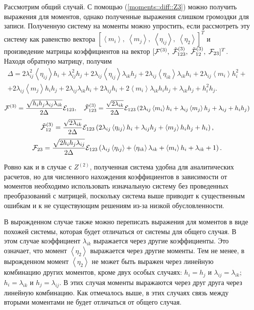 \documentclass[12pt]{article}
\def\sr#1{\left<#1\right>}
\def\ZV{Z^{(2)}}
\begin{document}
Рассмотрим общий случай. С помощью (\ref{moments::diff::Z3}) можно получить выражения для моментов, однако полученные выражения слишком громоздки для записи. Полученную систему на моменты можно упростить, если рассмотреть эту систему как равенство вектора $[\sr{m_i},\; \sr{m_j},\;\sr{\eta_{ij}},\; \sr{\eta_2}]^T$ и произведение матрицы коэффициентов на вектор $[{\cal F}^{(3)},\; \tilde{\cal F}_{123}^{(3)},\; \tilde{\cal F}_{12}^{(3)},\; {\cal F}_{23}]^T$. Находя обратную матрицу, получим
\begin{multline*}
    \Delta = 2 \lambda_{ij}^{2} \left<\eta_{ij}\right> h_i + \lambda_{ij}^{2} h_j + 2 \lambda_{ij} \left<\eta_{ij}\right> \lambda_{ik} h_j + 2 \lambda_{ij} \left<\eta_{ik}\right> \lambda_{ik} h_i + 2 \lambda_{ij} \left<{m_i}\right> h_i^{2} +
    \\
    + 2 \lambda_{ij} \left<{m_j}\right> h_i h_j + 2 \lambda_{ij} \lambda_{ik} h_i + 2 \lambda_{ij} h_i + 2 \left<{m_i}\right> \lambda_{ik} h_i h_j + \lambda_{ik} h_j + h_i^{2} h_j.
\end{multline*}
\begin{equation}
    {\cal F}^{(3)} = \frac{\sqrt{h_ih_j\lambda_{ij}\lambda_{ik}}}{2 \Delta}{\cal E}_{123}, \quad
    \tilde{\cal F}_{123}^{(3)} = \frac{\sqrt{2\lambda_{ik}}}{2 \Delta}{\cal E}_{123} \left(2 \lambda_{ij} \left<{m_i}\right> h_i + \lambda_{ij} \left<{m_j}\right> h_j + \lambda_{ij} + h_i h_j\right)
\end{equation}
\begin{equation}
    \tilde{\cal F}_{12}^{(3)} = \frac{\sqrt{2\lambda_{ik}}}{2 \Delta}{\cal E}_{123} \left(2 \lambda_{ij} \left<\eta_{ij}\right> h_i + \lambda_{ij} h_j + \left<{m_j}\right> h_i h_j + h_i\right),
\end{equation}
\begin{equation}
    {\cal F}_{23} = \frac{\sqrt{2h_ih_j\lambda_{ij}}}{2 \Delta}{\cal E}_{123}\left(\lambda_{ij} \left<\eta_{ij}\right> + \left<\eta_{ik}\right> \lambda_{ik} + \left<{m_i}\right> h_i + \lambda_{ik} + 1\right).
\end{equation}
 
Ровно как и в случае с $\ZV$, полученная система удобна для аналитических расчетов, но для численного нахождения коэффициентов в зависимости от моментов необходимо использовать изначальную систему без проведенных преобразований с матрицей, поскольку система выше приводит к существенным ошибкам и к не существующим решениям из-за низкой обусловленности.

В вырожденном случае также можно переписать выражения для моментов в виде похожей системы, которая будет отличаться от системы для общего случая. В этом случае коэффициент $\lambda_{ik}$ выражается через другие коэффициенты. Это означает, что момент $\sr{\eta_2}$ выражается через другие моменты. Тем не менее, в вырожденном момент $\sr{\eta_2}$ не может быть выражен через линейную комбинацию других моментов, кроме двух особых случаях: $h_i=h_j$ и $\lambda_{ij}=\lambda_{ik}$; $h_i=\lambda_{ik}$ и $h_j=\lambda_{ij}$. В этих случая моменты выражаются через друг друга через линейную комбинацию. Как отмечалось выше, в этих случаях связь между вторыми моментами не будет отличаться от общего случая.
\end{document}
